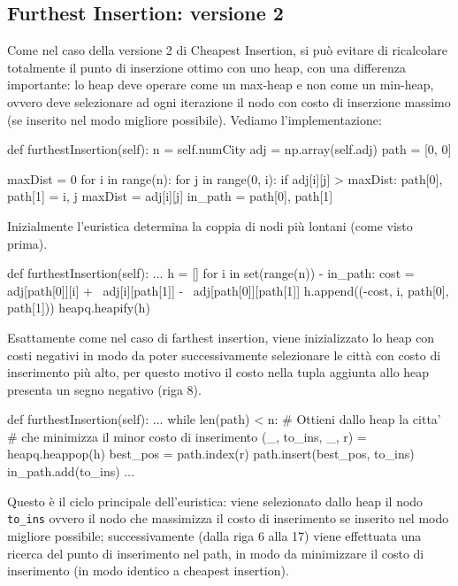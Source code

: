 \documentclass[a4paper,12pt]{report}
\begin{document}
\subsection{Furthest Insertion: versione 2}
Come nel caso della versione 2 di Cheapest Insertion, si può evitare di ricalcolare totalmente il punto di inserzione ottimo con uno heap, con una differenza importante: lo heap deve operare come un max-heap e non come un min-heap, ovvero deve selezionare ad ogni iterazione il nodo con costo di inserzione massimo (se inserito nel modo migliore possibile). Vediamo l'implementazione:
\begin{python}
def furthestInsertion(self):
  n = self.numCity
  adj = np.array(self.adj)
  path = [0, 0]

  maxDist = 0
  for i in range(n):
      for j in range(0, i):
          if adj[i][j] > maxDist:
              path[0], path[1] = i, j
              maxDist = adj[i][j]
  in_path = {path[0], path[1]}
\end{python}
Inizialmente l'euristica determina la coppia di nodi più lontani (come visto prima).
\begin{python}
def furthestInsertion(self):
  ...
  h = []
  for i in set(range(n)) - in_path:
    cost = adj[path[0]][i] + \
           adj[i][path[1]] - \
           adj[path[0]][path[1]]
    h.append((-cost, i, path[0], path[1]))
  heapq.heapify(h)
\end{python}
Esattamente come nel caso di farthest insertion, viene inizializzato lo heap con costi negativi in modo da poter successivamente selezionare le città con costo di inserimento più alto, per questo motivo il costo nella tupla aggiunta allo heap presenta un segno negativo (riga 8).
\begin{python}
def furthestInsertion(self):
  ...
  while len(path) < n:
    # Ottieni dallo heap la citta' 
    # che minimizza il minor costo di inserimento
    (_, to_ins, _, r) = heapq.heappop(h)
    best_pos = path.index(r)
    path.insert(best_pos, to_ins)
    in_path.add(to_ins)
    ...
\end{python}
Questo è il ciclo principale dell'euristica: viene selezionato dallo heap il nodo \lstinline!to_ins! ovvero il nodo che massimizza il costo di inserimento se inserito nel modo migliore possibile; successivamente (dalla riga 6 alla 17) viene effettuata una ricerca del punto di inserimento nel path, in modo da minimizzare il costo di inserimento (in modo identico a cheapest insertion).
\end{document}
